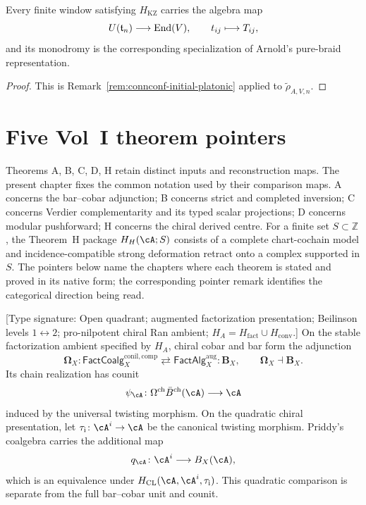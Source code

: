 \begin{corollary}
\label{cor:climax-arnold-common-root-platonic}
\ClaimStatusProvedHere
Every finite window satisfying $H_{\mathrm{KZ}}$ carries the algebra
map
\begin{equation}
\label{eq:four-shadows-platonic}
 U(\mathfrak t_n)\longrightarrow\mathrm{End}(V),
 \qquad t_{ij}\longmapsto T_{ij},
\end{equation}
and its monodromy is the corresponding specialization of Arnold's
pure-braid representation.
\end{corollary}

\begin{proof}
This is Remark~\ref{rem:connconf-initial-platonic} applied to
$\widetilde\rho_{A,V,n}$.
\end{proof}

\section{Five Vol~I theorem pointers}
\label{sec:climax-platonic-five-theorems-corollaries}

Theorems A, B, C, D, H retain distinct inputs and reconstruction
maps.  The present chapter fixes the common notation used by their
comparison maps.  A concerns the bar--cobar adjunction; B concerns
strict and completed inversion; C concerns Verdier complementarity and
its typed scalar projections; D concerns modular pushforward; H
concerns the chiral derived centre.  For a finite set
$S\subset\mathbb Z$, the Theorem~H package $H_H(\cA;S)$ consists of a
complete chart-cochain model and incidence-compatible strong
deformation retract onto a complex supported in $S$.  The pointers
below name the chapters where each theorem is stated and proved in
its native form; the corresponding pointer remark identifies the
categorical direction being read.

\begin{theorem}
\label{thm:theorem-a-platonic-pointer}
\ClaimStatusConditional
\textup{[Type signature: Open quadrant; augmented factorization
presentation; Beilinson levels \(1\leftrightarrow2\);
pro-nilpotent chiral Ran ambient;
\(H_A=H_{\mathrm{fact}}\cup H_{\mathrm{conv}}\).]}
On the stable factorization ambient specified by \(H_A\), chiral
cobar and bar form the adjunction
\[
 \boldsymbol\Omega_X
 :
 \mathsf{FactCoalg}_X^{\mathrm{conil,comp}}
 \rightleftarrows
 \mathsf{FactAlg}_X^{\mathrm{aug}}
 :
 \mathbf B_X,
 \qquad
 \boldsymbol\Omega_X\dashv\mathbf B_X.
\]
Its chain realization has counit
\[
 \psi_\cA\colon
 \Omega^{\mathrm{ch}}\bar B^{\mathrm{ch}}(\cA)\longrightarrow\cA
\]
induced by the universal twisting morphism.  On the quadratic chiral
presentation, let
$\tau_{\mathrm i}\colon\cA^i\to\cA$ be the canonical twisting
morphism.  Priddy's coalgebra carries the additional map
\[
 q_\cA\colon\cA^i\longrightarrow B_X(\cA),
\]
which is an equivalence under
$H_{\mathrm{CL}}(\cA,\cA^i,\tau_{\mathrm i})$.  This quadratic
comparison is separate from the full bar--cobar unit and counit.
\end{theorem}

